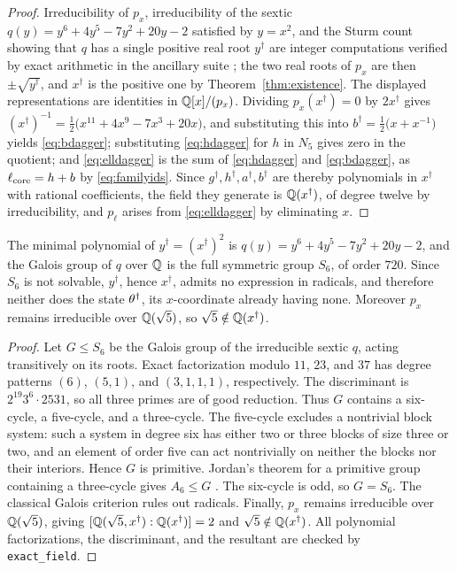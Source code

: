\begin{proof}
Irreducibility of $p_x$, irreducibility of the sextic $q(y)=y^6+4y^5-7y^2+20y-2$ satisfied by $y=x^2$, and the Sturm count showing that $q$ has a single positive real root $y^\dagger$ are integer computations verified by exact arithmetic in the ancillary suite \cite{anc}; the two real roots of $p_x$ are then $\pm\sqrt{y^\dagger}$, and $x^\dagger$ is the positive one by Theorem~\ref{thm:existence}. The displayed representations are identities in $\mathbb{Q}[x]/(p_x)$. Dividing $p_x(x^\dagger)=0$ by $2x^\dagger$ gives $(x^\dagger)^{-1}=\frac12\bigl(x^{11}+4x^{9}-7x^{3}+20x\bigr)$, and substituting this into $b^\dagger=\frac12\bigl(x+x^{-1}\bigr)$ yields \eqref{eq:bdagger}; substituting \eqref{eq:hdagger} for $h$ in $N_5$ gives zero in the quotient; and \eqref{eq:elldagger} is the sum of \eqref{eq:hdagger} and \eqref{eq:bdagger}, as $\ell_{\mathrm{core}}=h+b$ by \eqref{eq:familyids}. Since $g^\dagger,h^\dagger,a^\dagger,b^\dagger$ are thereby polynomials in $x^\dagger$ with rational coefficients, the field they generate is $\mathbb{Q}(x^\dagger)$, of degree twelve by irreducibility, and $p_\ell$ arises from \eqref{eq:elldagger} by eliminating $x$.
\end{proof}

\begin{theorem}\label{thm:s6}
The minimal polynomial of $y^\dagger=(x^\dagger)^2$ is $q(y)=y^6+4y^5-7y^2+20y-2$, and the Galois group of $q$ over $\mathbb{Q}$ is the full symmetric group $S_6$, of order $720$. Since $S_6$ is not solvable, $y^\dagger$, hence $x^\dagger$, admits no expression in radicals, and therefore neither does the state $\theta^\dagger$, its $x$-coordinate already having none. Moreover $p_x$ remains irreducible over $\mathbb{Q}(\sqrt5)$, so $\sqrt5\notin\mathbb{Q}(x^\dagger)$.
\end{theorem}

\begin{proof}
Let $G\le S_6$ be the Galois group of the irreducible sextic $q$, acting transitively on its roots. Exact factorization modulo $11$, $23$, and $37$ has degree patterns $(6)$, $(5,1)$, and $(3,1,1,1)$, respectively. The discriminant is $2^{19}3^6\cdot2531$, so all three primes are of good reduction. Thus $G$ contains a six-cycle, a five-cycle, and a three-cycle. The five-cycle excludes a nontrivial block system: such a system in degree six has either two or three blocks of size three or two, and an element of order five can act nontrivially on neither the blocks nor their interiors. Hence $G$ is primitive. Jordan's theorem for a primitive group containing a three-cycle gives $A_6\le G$ \cite{jones2014}. The six-cycle is odd, so $G=S_6$. The classical Galois criterion rules out radicals. Finally, $p_x$ remains irreducible over $\mathbb{Q}(\sqrt5)$, giving $[\mathbb{Q}(\sqrt5,x^\dagger):\mathbb{Q}(x^\dagger)]=2$ and $\sqrt5\notin\mathbb{Q}(x^\dagger)$. All polynomial factorizations, the discriminant, and the resultant are checked by \texttt{exact\_field}.
\end{proof}

